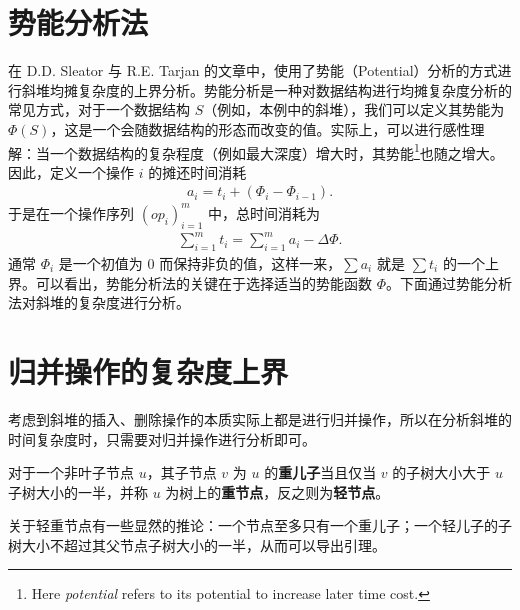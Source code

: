 \documentclass[a4paper]{ctexart}
\begin{document}
\section{势能分析法}
在 D.D. Sleator 与 R.E. Tarjan 的文章中，使用了势能（Potential）分析的方式进行斜堆均摊复杂度的上界分析。势能分析是一种对数据结构进行均摊复杂度分析的常见方式，对于一个数据结构 $S$（例如，本例中的斜堆），我们可以定义其势能为 $\Phi(S)$，这是一个会随数据结构的形态而改变的值。实际上，可以进行感性理解：当一个数据结构的复杂程度（例如最大深度）增大时，其势能\footnote{Here \textit{potential} refers to its potential to increase later time cost.}也随之增大。因此，定义一个操作 $i$ 的摊还时间消耗 \begin{align*}
    a_i = t_i + (\Phi_i - \Phi_{i-1}).
\end{align*}
于是在一个操作序列 $(op_i)_{i=1}^m$ 中，总时间消耗为 \begin{align*}
    \sum_{i=1}^mt_i=\sum_{i=1}^ma_i-\Delta\Phi.
\end{align*}
通常 $\Phi_i$ 是一个初值为 $0$ 而保持非负的值，这样一来，$\sum a_i$ 就是 $\sum t_i$ 的一个上界。可以看出，势能分析法的关键在于选择适当的势能函数 $\Phi$。下面通过势能分析法对斜堆的复杂度进行分析。

\section{归并操作的复杂度上界}

考虑到斜堆的插入、删除操作的本质实际上都是进行归并操作，所以在分析斜堆的时间复杂度时，只需要对归并操作进行分析即可。

\begin{definition}[重节点]
    对于一个非叶子节点 $u$，其子节点 $v$ 为 $u$ 的\textbf{重儿子}当且仅当 $v$ 的子树大小大于 $u$ 子树大小的一半，并称 $u$ 为树上的\textbf{重节点}，反之则为\textbf{轻节点}。
\end{definition}

关于轻重节点有一些显然的推论：一个节点至多只有一个重儿子；一个轻儿子的子树大小不超过其父节点子树大小的一半，从而可以导出引理。
\end{document}
